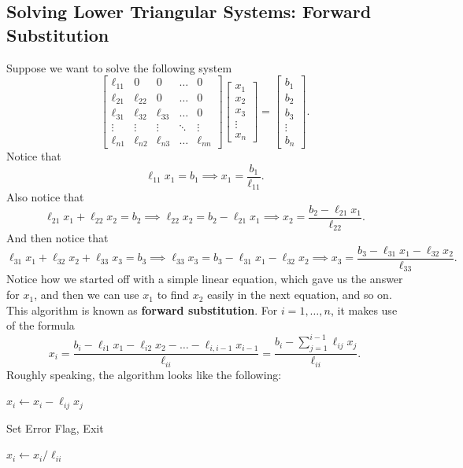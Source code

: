 \documentclass[letterpaper]{article}
\newcommand{\0}{\mathbf{0}}
\begin{document}
\subsection{Solving Lower Triangular Systems: Forward Substitution}
Suppose we want to solve the following system 
\[\begin{bmatrix}
    \ell_{11} & 0 & 0 & \hdots & 0  \\ 
    \ell_{21} & \ell_{22} & 0 & \hdots & 0  \\ 
    \ell_{31} & \ell_{32} & \ell_{33} & \hdots & 0  \\ 
    \vdots & \vdots & \vdots & \ddots & \vdots \\ 
    \ell_{n1} & \ell_{n2} & \ell_{n3} & \hdots & \ell_{nn}
\end{bmatrix} \begin{bmatrix}
    x_1 \\ x_2 \\ x_3 \\ \vdots \\ x_n
\end{bmatrix} = \begin{bmatrix}
    b_1 \\ b_2 \\ b_3 \\ \vdots \\ b_n
\end{bmatrix}.\]
Notice that \[\ell_{11} x_1 = b_1 \implies x_1 = \frac{b_1}{\ell_{11}}.\]
Also notice that \[\ell_{21} x_1 + \ell_{22}x_2 = b_2 \implies \ell_{22}x_2 = b_2 - \ell_{21}x_1 \implies x_2 = \frac{b_2 - \ell_{21} x_1}{\ell_{22}}.\]
And then notice that \[\ell_{31} x_1 + \ell_{32} x_2 + \ell_{33} x_3 = b_3 \implies \ell_{33}x_3 = b_3 - \ell_{31}x_1 - \ell_{32}x_2 \implies x_3 = \frac{b_3 - \ell_{31}x_1 - \ell_{32}x_2}{\ell_{33}}.\]
Notice how we started off with a simple linear equation, which gave us the answer for $x_1$, and then we can use $x_1$ to find $x_2$ easily in the next equation, and so on. This algorithm is known as \textbf{forward substitution}. For $i = 1, \hdots, n$, it makes use of the formula 
\[\boxed{x_i = \frac{b_i - \ell_{i1} x_1 - \ell_{i2} x_2 - \hdots - \ell_{i,i - 1} x_{i - 1}}{\ell_{ii}} = \frac{b_i - \sum_{j = 1}^{i - 1} \ell_{ij} x_j}{\ell_{ii}}.}\]
Roughly speaking, the algorithm looks like the following:
\begin{algorithmic}
            \State $x_i \gets x_i - \ell_{ij} x_j$
        \EndFor

            \State Set Error Flag, Exit 
        \EndIf

        \State $x_i \gets x_i / \ell_{ii}$
    \EndFor
\end{algorithmic}
\end{document}
